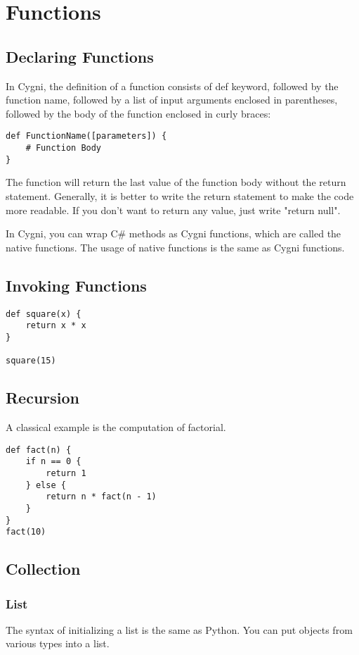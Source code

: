 \chapter{Functions}
\section{Declaring Functions}
In Cygni, the definition of a function consists of def keyword, 
followed by the function name, 
followed by a list of input arguments enclosed in parentheses, 
followed by the body of the function enclosed in curly braces:

\begin{lstlisting}
def FunctionName([parameters]) {
	# Function Body
}
\end{lstlisting}
The function will return the last value of the function body without the return statement. Generally, it is better to write the return statement to make the code more readable. If you don't want to return any value, just write "return null".

In Cygni, you can wrap C\# methods as Cygni functions, which are called the native functions. The usage of native functions is the same as Cygni functions.
\section{Invoking Functions}
\begin{lstlisting}
def square(x) {
	return x * x
}

square(15)
\end{lstlisting}

\section{Recursion}
A classical example is the computation of factorial.
\begin{lstlisting}
def fact(n) {
	if n == 0 {
		return 1
	} else {
		return n * fact(n - 1)
	}
}
fact(10)
\end{lstlisting}

\section{Collection}
\subsection{List}
The syntax of initializing a list is the same as Python. You can put objects from various types into a list.

